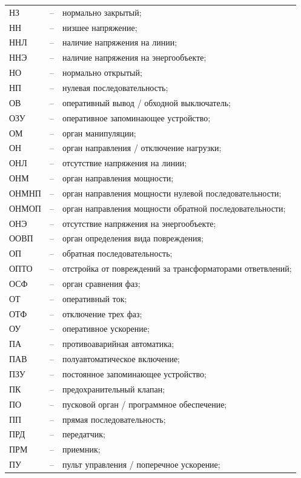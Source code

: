 \begin{longtable}{L{2cm} L{0.5cm} L{20cm}}
НЗ & -- & нормально закрытый; \\
НН & -- & низшее напряжение; \\
ННЛ & -- & наличие напряжения на линии; \\
ННЭ & -- & наличие напряжения на энергообъекте; \\
НО & -- & нормально открытый; \\
НП & -- & нулевая последовательность; \\
ОВ & -- & оперативный вывод / обходной выключатель; \\
ОЗУ & -- & оперативное запоминающее устройство; \\
ОМ & -- & орган манипуляции; \\
ОН & -- & орган направления / отключение нагрузки; \\
ОНЛ & -- & отсутствие напряжения на линии; \\
ОНМ & -- & орган направления мощности; \\
ОНМНП & -- & орган направления мощности нулевой последовательности; \\
ОНМОП & -- & орган направления мощности обратной последовательности; \\
ОНЭ & -- & отсутствие напряжения на энергообъекте; \\
ООВП & -- & орган определения вида повреждения; \\
ОП & -- & обратная последовательность; \\
ОПТО & -- & отстройка от повреждений за трансформаторами ответвлений; \\
ОСФ & -- & орган сравнения фаз; \\
ОТ & -- & оперативный ток; \\
ОТФ & -- & отключение трех фаз; \\
ОУ & -- & оперативное ускорение; \\
ПА & -- & противоаварийная автоматика; \\
ПАВ & -- & полуавтоматическое включение; \\
ПЗУ & -- & постоянное запоминающее устройство; \\
ПК & -- & предохранительный клапан; \\
ПО & -- & пусковой орган / программное обеспечение; \\
ПП & -- & прямая последовательность; \\
ПРД & -- & передатчик; \\
ПРМ & -- & приемник; \\
ПУ & -- & пульт управления / поперечное ускорение; \\

\end{longtable}
